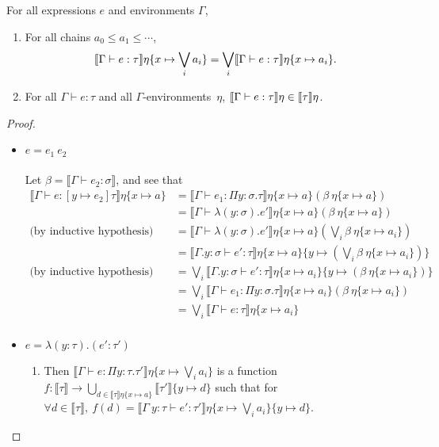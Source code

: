 \begin{thm} 
For all expressions $e$ and environments $\Gamma$,
\begin{enumerate}
\item For all chains $a_0\leq a_1\leq\dotsb$,
\begin{align*}
\llbracket{{\Gamma}\vdash{e}:{\tau}}\rrbracket{\eta\{{x}\mapsto{\bigvee_i a_i}\}} =
\bigvee_i\llbracket{{\Gamma}\vdash{e}:{\tau}}\rrbracket{\eta\{{x}\mapsto{a_i}\}}.
\end{align*}
\item For all $\Gamma\vdash e : \tau$ and all $\Gamma$-environments~$\eta$,
$\llbracket{{\Gamma}\vdash{e}:{\tau}}\rrbracket{\eta}\in\llbracket{\tau}\rrbracket\eta$.
\end{enumerate}
\end{thm}

\begin{proof}
\begin{itemize}
 \item $ e = e_1 \ e_2$ \\ \\
Let $\beta = \llbracket \Gamma \vdash e_2 : \sigma \rrbracket$, and see that
\begin{align*}
\llbracket \Gamma \vdash e : [y \mapsto e_2]\tau \rrbracket\eta\{x \mapsto a \} &=
\llbracket \Gamma \vdash e_1 : \Pi y: \sigma.\tau \rrbracket\eta\{x \mapsto a\}
(\beta \ \eta\{x \mapsto a\}) \\
&= \llbracket \Gamma \vdash \lambda (y:\sigma).e'  \rrbracket\eta\{x \mapsto a\}
(\beta \ \eta\{x \mapsto a\}) \\
\text{(by inductive hypothesis)} &= 
\llbracket \Gamma \vdash \lambda (y:\sigma).e' \rrbracket\eta\{x \mapsto a\}
(\bigvee_i \beta \ \eta\{x \mapsto a_i\}) \\
&= \llbracket \Gamma. y : \sigma \vdash e' : \tau \rrbracket\eta\{x \mapsto a\}\{y \mapsto (\bigvee_i \beta \ \eta\{x \mapsto a_i\})\} \\
\text{(by inductive hypothesis)}&= \bigvee_i \llbracket \Gamma. y : \sigma \vdash e' : \tau \rrbracket\eta\{x \mapsto 
a_i\}\{y \mapsto (\beta \ \eta\{x \mapsto a_i\})\} \\
&=\bigvee_i \llbracket \Gamma \vdash e_1: \Pi y:\sigma.\tau\rrbracket\eta\{x\mapsto a_i\}
(\beta \ \eta\{x\mapsto a_i\}) \\
&= \bigvee_i \llbracket \Gamma \vdash e:\tau\rrbracket\eta\{ x \mapsto a_i\} \\
\end{align*}
 \item $e = \lambda (y : \tau) . (e' : \tau')$
 \begin{enumerate}
 \item Then $\llbracket \Gamma \vdash e : \Pi y: \tau.\tau' \rrbracket\eta\{x\mapsto  \bigvee_i a_i\}$ 
 is a function $f: \llbracket \tau \rrbracket \rightarrow \bigcup_{d \in \llbracket \tau \rrbracket\eta\{x\mapsto a\}}\llbracket 
 \tau'  \rrbracket\{y\mapsto d\}$ such that for 
 $\forall d \in \llbracket \tau \rrbracket, \ f(d) = \llbracket \Gamma \ y : \tau \vdash e' : \tau' 
 \rrbracket\eta\{x\mapsto  \bigvee_i a_i\}\{y \mapsto d\}$. 
 

\end{enumerate}
\end{itemize}
\end{proof}
